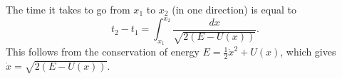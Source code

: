 The time it takes to go from $x_1$ to $x_2$ (in one direction) is equal to
$$t_2 - t_1 = \int_{x_1}^{x_2} \frac{dx}{\sqrt{2(E - U(x))}}.$$
This follows from the conservation of energy $E = \frac{1}{2}\dot{x}^2 + U(x)$, which gives $\dot{x} = \sqrt{2(E - U(x))}$.
